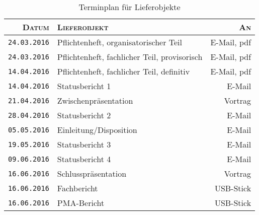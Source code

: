 \begin{table}[h!]
    \centering
    \caption{Terminplan f\"ur Lieferobjekte}
    \label{tab:lieferobj}
    \begin{tabular}{rp{80mm}r}
        \toprule
        \textsc{Datum} & \textsc{Lieferobjekt} & \textsc{An} \\
        \midrule
        \texttt{24.03.2016} & Pflichtenheft, organisatorischer Teil         & E-Mail, pdf \\
        \texttt{24.03.2016} & Pflichtenheft, fachlicher Teil, provisorisch  & E-Mail, pdf \\
        \texttt{14.04.2016} & Pflichtenheft, fachlicher Teil, definitiv     & E-Mail, pdf \\
        \texttt{14.04.2016} & Statusbericht 1                               & E-Mail \\
        \texttt{21.04.2016} & Zwischenpr\"asentation                        & Vortrag \\
        \texttt{28.04.2016} & Statusbericht 2                               & E-Mail \\
        \texttt{05.05.2016} & Einleitung/Disposition                        & E-Mail \\
        \texttt{19.05.2016} & Statusbericht 3                               & E-Mail \\
        \texttt{09.06.2016} & Statusbericht 4                               & E-Mail \\
        \texttt{16.06.2016} & Schlusspr\"asentation                         & Vortrag \\
        \texttt{16.06.2016} & Fachbericht                                   & USB-Stick \\
        \texttt{16.06.2016} & PMA-Bericht                                   & USB-Stick \\
        \bottomrule
    \end{tabular}
\end{table}

